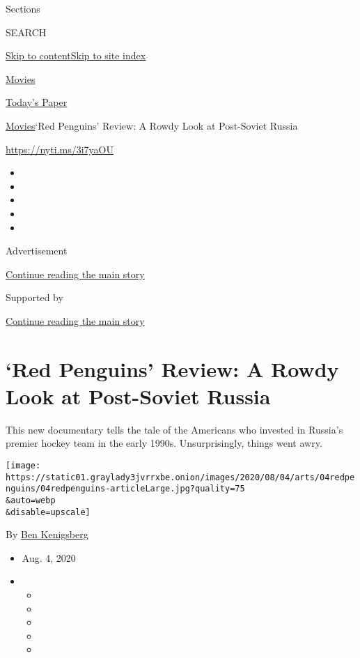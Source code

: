 Sections

SEARCH

\protect\hyperlink{site-content}{Skip to
content}\protect\hyperlink{site-index}{Skip to site index}

\href{https://www.nytimes3xbfgragh.onion/section/movies}{Movies}

\href{https://myaccount.nytimes3xbfgragh.onion/auth/login?response_type=cookie\&client_id=vi}{}

\href{https://www.nytimes3xbfgragh.onion/section/todayspaper}{Today's
Paper}

\href{/section/movies}{Movies}\textbar{}`Red Penguins' Review: A Rowdy
Look at Post-Soviet Russia

\url{https://nyti.ms/3i7yaOU}

\begin{itemize}
\item
\item
\item
\item
\item
\end{itemize}

Advertisement

\protect\hyperlink{after-top}{Continue reading the main story}

Supported by

\protect\hyperlink{after-sponsor}{Continue reading the main story}

\hypertarget{red-penguins-review-a-rowdy-look-at-post-soviet-russia}{%
\section{`Red Penguins' Review: A Rowdy Look at Post-Soviet
Russia}\label{red-penguins-review-a-rowdy-look-at-post-soviet-russia}}

This new documentary tells the tale of the Americans who invested in
Russia's premier hockey team in the early 1990s. Unsurprisingly, things
went awry.

\texttt{[image: https://static01.graylady3jvrrxbe.onion/images/2020/08/04/arts/04redpenguins/04redpenguins-articleLarge.jpg?quality=75\\\&auto=webp\\\&disable=upscale]}

By \href{https://www.nytimes3xbfgragh.onion/by/ben-kenigsberg}{Ben
Kenigsberg}

\begin{itemize}
\item
  Aug. 4, 2020
\item
  \begin{itemize}
  \item
  \item
  \item
  \item
  \item
  \end{itemize}
\end{itemize}

